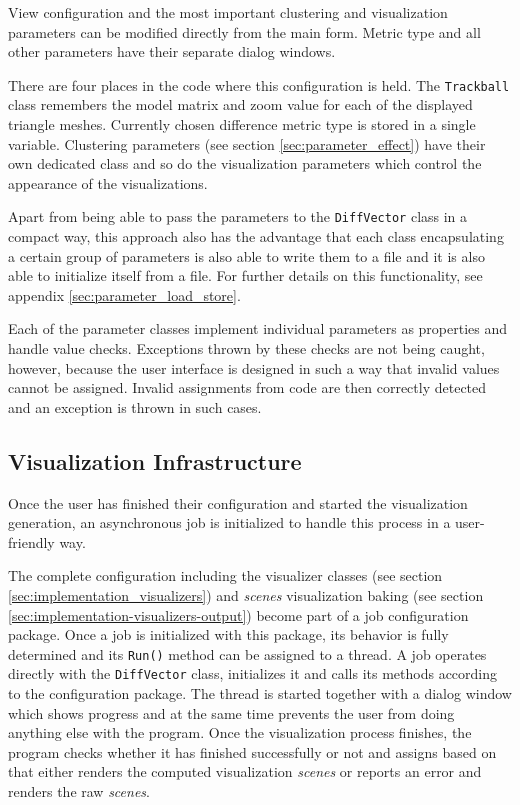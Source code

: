 View configuration and the most important clustering and visualization parameters can be modified directly from the main form. Metric type and all other parameters have their separate dialog windows.

There are four places in the code where this configuration is held. The \verb+Trackball+ class remembers the model matrix and zoom value for each of the displayed triangle meshes. Currently chosen difference metric type is stored in a single variable. Clustering parameters (see section \ref{sec:parameter_effect}) have their own dedicated class and so do the visualization parameters which control the appearance of the visualizations.

Apart from being able to pass the parameters to the \verb+DiffVector+ class in a compact way, this approach also has the advantage that each class encapsulating a certain group of parameters is also able to write them to a file and it is also able to initialize itself from a file\footnotemark. For further details on this functionality, see appendix \ref{sec:parameter_load_store}.


Each of the parameter classes implement individual parameters as properties and handle value checks. Exceptions thrown by these checks are not being caught, however, because the user interface is designed in such a way that invalid values cannot be assigned. Invalid assignments from code are then correctly detected and an exception is thrown in such cases.
\subsection{Visualization Infrastructure}

Once the user has finished their configuration and started the visualization generation, an asynchronous job is initialized to handle this process in a user-friendly way.

The complete configuration including the visualizer classes (see section \ref{sec:implementation_visualizers}) and {\it scenes} visualization baking (see section \ref{sec:implementation-visualizers-output}) become part of a job configuration package. Once a job is initialized with this package, its behavior is fully determined and its \verb+Run()+ method can be assigned to a thread. A job operates directly with the \verb+DiffVector+ class, initializes it and calls its methods according to the configuration package. The thread is started together with a dialog window which shows progress and at the same time prevents the user from doing anything else with the program. Once the visualization process finishes, the program checks whether it has finished successfully or not and assigns based on that either renders the computed visualization {\it scenes} or reports an error and renders the raw {\it scenes}.
